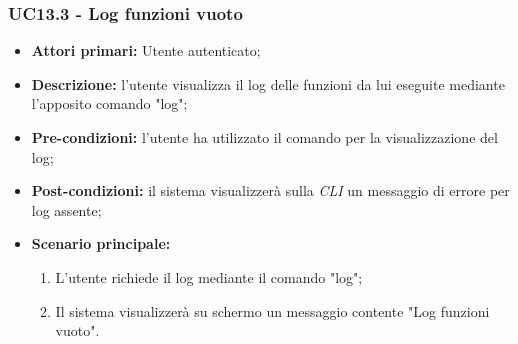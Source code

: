 \subsubsection{UC13.3 - Log funzioni vuoto}
\begin{itemize}
	\item \textbf{Attori primari:} Utente autenticato;
	\item \textbf{Descrizione:} l'utente visualizza il log delle funzioni da lui eseguite mediante l'apposito comando "log"; 
	\item \textbf{Pre-condizioni:} l'utente ha utilizzato il comando per la visualizzazione del log;
	\item \textbf{Post-condizioni:} il sistema visualizzerà sulla \textit{CLI\glo} un messaggio di errore per log assente;
	\item \textbf{Scenario principale:} 
	\begin{enumerate}
		\item L'utente richiede il log mediante il comando "log";
		\item Il sistema visualizzerà su schermo un messaggio contente "Log funzioni vuoto".
	\end{enumerate}
\end{itemize}